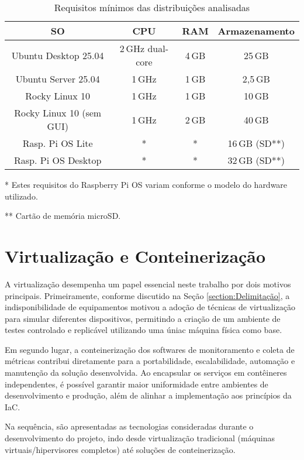 \begin{table}[H]
\centering
\caption{Requisitos mínimos das distribuições analisadas}
\label{tab:requisitos-minimos}
\begin{tabular}{@{}c c c c@{}}
\toprule
\textbf{SO} & \textbf{CPU} & \textbf{RAM} & \textbf{Armazenamento} \\
\midrule
Ubuntu Desktop 25.04 & 2\,GHz dual-core & 4\,GB & 25\,GB \\
Ubuntu Server 25.04 & 1\,GHz & 1\,GB & 2{,}5\,GB \\
Rocky Linux 10 & 1\,GHz & 1\,GB & 10\,GB \\
Rocky Linux 10 (sem GUI) & 1\,GHz & 2\,GB & 40\,GB \\
Rasp. Pi OS Lite & * & * & 16\,GB (SD**) \\
Rasp. Pi OS Desktop & * & * & 32\,GB (SD**) \\
\bottomrule
\end{tabular}
\begin{flushleft}
\footnotesize

* Estes requisitos do Raspberry Pi OS variam conforme o modelo do hardware utilizado.

** Cartão de memória microSD.
\end{flushleft}
\end{table}


\section{Virtualização e Conteinerização}
\label{section:Virtualizacao}

A virtualização desempenha um papel essencial neste trabalho por dois motivos principais. Primeiramente, conforme discutido na Seção \ref{section:Delimitação}, a indisponibilidade de equipamentos motivou a adoção de técnicas de virtualização para simular diferentes dispositivos, permitindo a criação de um ambiente de testes controlado e replicável utilizando uma úniac máquina física como base. 

Em segundo lugar, a conteinerização dos softwares de monitoramento e coleta de métricas contribui diretamente para a portabilidade, escalabilidade, automação e manutenção da solução desenvolvida. Ao encapsular os serviços em contêineres independentes, é possível garantir maior uniformidade entre ambientes de desenvolvimento e produção, além de alinhar a implementação aos princípios da IaC.

Na sequência, são apresentadas as tecnologias consideradas durante o desenvolvimento do projeto, indo desde virtualização tradicional (máquinas virtuais/hipervisores completos) até soluções de conteinerização.

